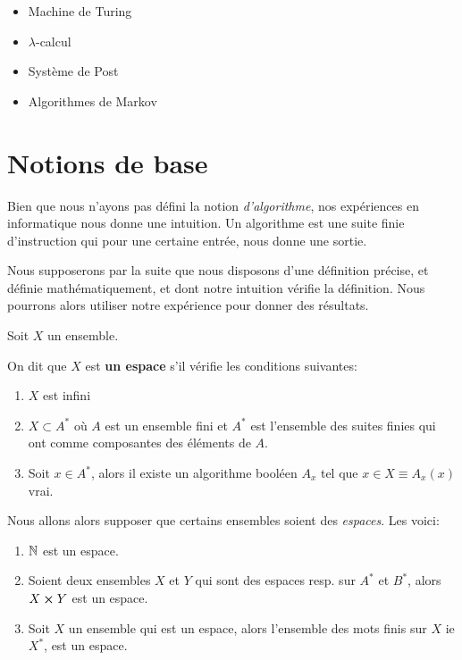 \begin{itemize}
	\item Machine de Turing
	\item $\lambda$-calcul
	\item Système de Post
	\item Algorithmes de Markov
\end{itemize}

\section{Notions de base}

Bien que nous n'ayons pas défini la notion \textit{d'algorithme}, nos
expériences en informatique nous donne une intuition. Un algorithme est une
suite finie d'instruction qui pour une certaine entrée, nous donne une sortie.

Nous supposerons par la suite que nous disposons d'une définition précise, et
définie mathématiquement, et dont notre intuition vérifie la définition.
Nous pourrons alors utiliser notre expérience pour donner des résultats.

\begin{definition}
	Soit $X$ un ensemble.

	On dit que $X$ est \textbf{un espace} s'il vérifie les conditions suivantes:

	\begin{enumerate}
		\item $X$ est infini
		\item $X \subset A^{*}$ où $A$ est un ensemble fini et $A^{*}$ est
			l'ensemble des suites finies qui ont comme composantes des éléments
			de $A$.
		\item Soit $x \in A^{*}$, alors il existe un algorithme booléen $A_{x}$ tel que
			$x \in X \equiv A_{x}(x)$ vrai.
	\end{enumerate}
\end{definition}

Nous allons alors supposer que certains ensembles soient des \textit{espaces}.
Les voici:

\begin{enumerate}
	\item $\mathbb{N}$ est un espace.
	\item Soient deux ensembles $X$ et $Y$ qui sont des espaces resp. sur $A^{*}
		$ et $B^{*}$, alors $X
		\cross Y$ est un espace.
	\item Soit $X$ un ensemble qui est un espace, alors l'ensemble des mots
		finis sur $X$ ie $X^{*}$, est un espace.
\end{enumerate}


